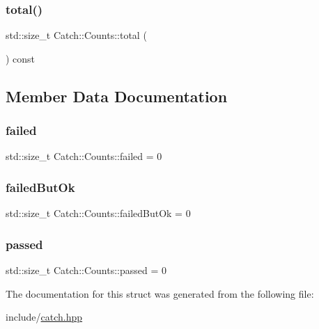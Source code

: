 \mbox{\label{structCatch_1_1Counts_a94f969c09cf52d1339c085c9603cd1d3}} 
\subsubsection{\texorpdfstring{total()}{total()}}
{\footnotesize\ttfamily std\+::size\+\_\+t Catch\+::\+Counts\+::total (\begin{DoxyParamCaption}{ }\end{DoxyParamCaption}) const}



\subsection{Member Data Documentation}
\mbox{\label{structCatch_1_1Counts_a19982a3817a3bc2c07f0290e71f497a3}} 
\subsubsection{\texorpdfstring{failed}{failed}}
{\footnotesize\ttfamily std\+::size\+\_\+t Catch\+::\+Counts\+::failed = 0}

\mbox{\label{structCatch_1_1Counts_ac090973a2ff51394cd452718e75c073e}} 
\subsubsection{\texorpdfstring{failed\+But\+Ok}{failedButOk}}
{\footnotesize\ttfamily std\+::size\+\_\+t Catch\+::\+Counts\+::failed\+But\+Ok = 0}

\mbox{\label{structCatch_1_1Counts_ad28daaf3de28006400208b6dd0c631e6}} 
\subsubsection{\texorpdfstring{passed}{passed}}
{\footnotesize\ttfamily std\+::size\+\_\+t Catch\+::\+Counts\+::passed = 0}



The documentation for this struct was generated from the following file\+:\begin{DoxyCompactItemize}
\item 
include/\mbox{\hyperlink{catch_8hpp}{catch.\+hpp}}\end{DoxyCompactItemize}
